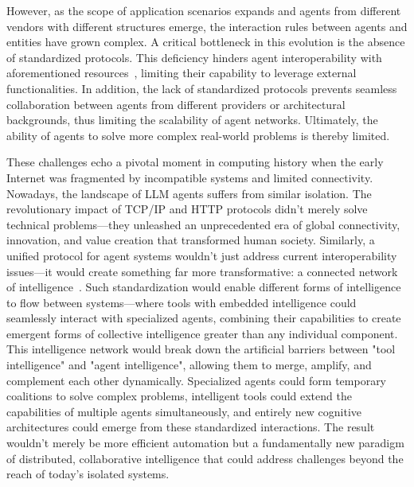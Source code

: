 \documentclass[10pt,preprint]{article}
\begin{document}
However, as the scope of application scenarios expands and agents from different vendors with different structures emerge, the interaction rules between agents and entities have grown complex. A critical bottleneck in this evolution is the absence of standardized protocols. This deficiency hinders agent interoperability with aforementioned resources~\citep{Qu_2025, patil2023gorillalargelanguagemodel, liu2024apigenautomatedpipelinegenerating}, limiting their capability to leverage external functionalities. In addition, the lack of standardized protocols prevents seamless collaboration between agents from different providers or architectural backgrounds, thus limiting the scalability of agent networks. Ultimately, the ability of agents to solve more complex real-world problems is thereby limited.


These challenges echo a pivotal moment in computing history when the early Internet was fragmented by incompatible systems and limited connectivity. Nowadays, the landscape of LLM agents suffers from similar isolation. The revolutionary impact of TCP/IP and HTTP protocols didn't merely solve technical problems—they unleashed an unprecedented era of global connectivity, innovation, and value creation that transformed human society.
Similarly, a unified protocol for agent systems wouldn't just address current interoperability issues—it would create something far more transformative: a connected network of intelligence~\citep{Multi-Agent-as-a-Service, yang2024llmbasedmultiagentsystemstechniques,chen2024internet,yang2025agentnetdecentralizedevolutionarycoordination}. Such standardization would enable different forms of intelligence to flow between systems—where tools with embedded intelligence could seamlessly interact with specialized agents, combining their capabilities to create emergent forms of collective intelligence greater than any individual component. This intelligence network would break down the artificial barriers between "tool intelligence" and "agent intelligence", allowing them to merge, amplify, and complement each other dynamically. Specialized agents could form temporary coalitions to solve complex problems, intelligent tools could extend the capabilities of multiple agents simultaneously, and entirely new cognitive architectures could emerge from these standardized interactions. The result wouldn't merely be more efficient automation but a fundamentally new paradigm of distributed, collaborative intelligence that could address challenges beyond the reach of today's isolated systems. 
\end{document}

